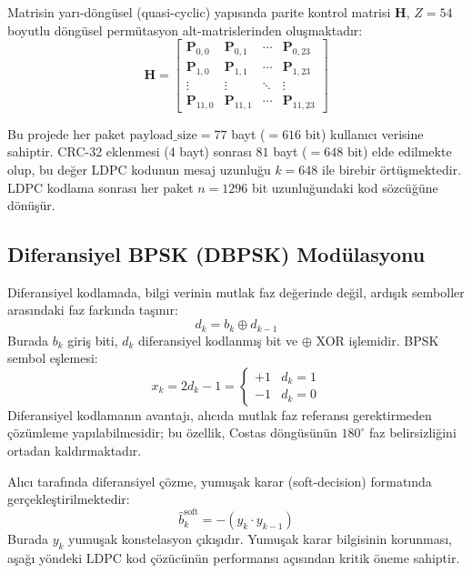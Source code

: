 Matrisin yarı-döngüsel (quasi-cyclic) yapısında parite kontrol matrisi $\mathbf{H}$, $Z = 54$ boyutlu döngüsel permütasyon alt-matrislerinden oluşmaktadır:
\begin{equation}
\mathbf{H} = \begin{bmatrix} \mathbf{P}_{0,0} & \mathbf{P}_{0,1} & \cdots & \mathbf{P}_{0,23} \\ \mathbf{P}_{1,0} & \mathbf{P}_{1,1} & \cdots & \mathbf{P}_{1,23} \\ \vdots & \vdots & \ddots & \vdots \\ \mathbf{P}_{11,0} & \mathbf{P}_{11,1} & \cdots & \mathbf{P}_{11,23} \end{bmatrix}
\end{equation}

Bu projede her paket $\text{payload\_size} = 77$ bayt ($= 616$ bit) kullanıcı verisine sahiptir. CRC-32 eklenmesi (4 bayt) sonrası $81$ bayt ($= 648$ bit) elde edilmekte olup, bu değer LDPC kodunun mesaj uzunluğu $k = 648$ ile birebir örtüşmektedir. LDPC kodlama sonrası her paket $n = 1296$ bit uzunluğundaki kod sözcüğüne dönüşür.

\subsection{Diferansiyel BPSK (DBPSK) Modülasyonu}
Diferansiyel kodlamada, bilgi verinin mutlak faz değerinde değil, ardışık semboller arasındaki faz farkında taşınır:
\begin{equation}
d_k = b_k \oplus d_{k-1}
\end{equation}
Burada $b_k$ giriş biti, $d_k$ diferansiyel kodlanmış bit ve $\oplus$ XOR işlemidir. BPSK sembol eşlemesi:
\begin{equation}
x_k = 2d_k - 1 = \begin{cases} +1 & d_k = 1 \\ -1 & d_k = 0 \end{cases}
\end{equation}
Diferansiyel kodlamanın avantajı, alıcıda mutlak faz referansı gerektirmeden çözümleme yapılabilmesidir; bu özellik, Costas döngüsünün $180^\circ$ faz belirsizliğini ortadan kaldırmaktadır.

Alıcı tarafında diferansiyel çözme, yumuşak karar (soft-decision) formatında gerçekleştirilmektedir:
\begin{equation}
\hat{b}_k^{\text{soft}} = -(y_k \cdot y_{k-1})
\end{equation}
Burada $y_k$ yumuşak konstelasyon çıkışıdır. Yumuşak karar bilgisinin korunması, aşağı yöndeki LDPC kod çözücünün performansı açısından kritik öneme sahiptir.

